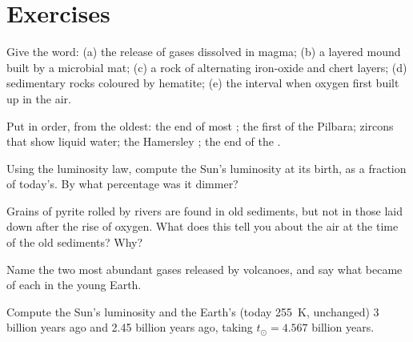 \section{Exercises}

\begin{exercise}[$\star$]\label{exo:g12:early-earth:1}
Give the word: (a) the release of gases dissolved in magma; (b) a layered
mound built by a microbial mat; (c) a rock of alternating iron-oxide and
chert layers; (d) sedimentary rocks coloured by hematite; (e) the interval
when oxygen first built up in the air.
\end{exercise}

\begin{exercise}[$\star$]\label{exo:g12:early-earth:2}
Put in order, from the oldest: the end of most ; the
first  of the Pilbara; zircons that show liquid water; the
Hamersley ; the end of the .
\end{exercise}

\begin{exercise}[$\star$]\label{exo:g12:early-earth:3}
Using the luminosity law, compute the Sun's luminosity at its birth, as a
fraction of today's. By what percentage was it dimmer?
\end{exercise}

\begin{exercise}[$\star$]\label{exo:g12:early-earth:4}
Grains of pyrite rolled by rivers are found in old sediments, but not in
those laid down after the rise of oxygen. What does this tell you about the
air at the time of the old sediments? Why?
\end{exercise}

\begin{exercise}[$\star$]\label{exo:g12:early-earth:5}
Name the two most abundant gases released by volcanoes, and say what became
of each in the young Earth.
\end{exercise}

\begin{exercise}[$\star\star$]\label{exo:g12:early-earth:6}
Compute the Sun's luminosity and the Earth's  (today
\qty{255}{K},  unchanged) 3 billion years ago and 2.45 billion years
ago, taking $t_\odot = 4.567$ billion years.
\end{exercise}

